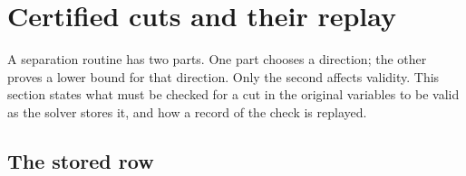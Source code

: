 \section{Certified cuts and their replay}\label{sec:certification}

A separation routine has two parts. One part chooses a direction; the other
proves a lower bound for that direction. Only the second affects validity.
This section states what must be checked for a cut in the original variables
to be valid as the solver stores it, and how a record of the check is
replayed.

\subsection{The stored row}\label{sec:exported-row}

